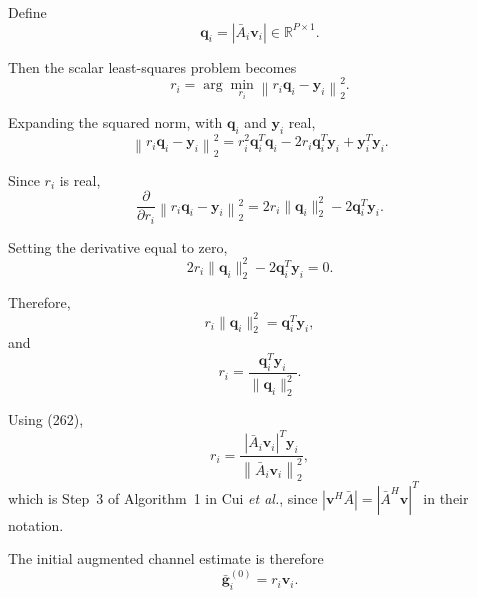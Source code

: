\documentclass[12pt,a4paper]{article}
\begin{document}
Define
\begin{equation}
\mathbf q_i
=
\left|
\bar A_i\mathbf v_i
\right|
\in\mathbb R^{P\times1}.
\tag{262}
\end{equation}

Then the scalar least-squares problem becomes
\begin{equation}
r_i
=
\arg\min_{r_i}
\left\|
r_i\mathbf q_i-\mathbf y_i
\right\|_2^2.
\tag{263}
\end{equation}

Expanding the squared norm, with $\mathbf q_i$ and $\mathbf y_i$ real,
\begin{equation}
\left\|
r_i\mathbf q_i-\mathbf y_i
\right\|_2^2
=
r_i^2\mathbf q_i^T\mathbf q_i
-
2r_i\mathbf q_i^T\mathbf y_i
+
\mathbf y_i^T\mathbf y_i.
\tag{264}
\end{equation}

Since $r_i$ is real,
\begin{equation}
\frac{\partial}{\partial r_i}
\left\|
r_i\mathbf q_i-\mathbf y_i
\right\|_2^2
=
2r_i\|\mathbf q_i\|_2^2
-
2\mathbf q_i^T\mathbf y_i.
\tag{265}
\end{equation}

Setting the derivative equal to zero,
\begin{equation}
2r_i\|\mathbf q_i\|_2^2
-
2\mathbf q_i^T\mathbf y_i
=
0.
\tag{266}
\end{equation}

Therefore,
\begin{equation}
r_i\|\mathbf q_i\|_2^2
=
\mathbf q_i^T\mathbf y_i,
\tag{267}
\end{equation}
and
\begin{equation}
\boxed{
r_i
=
\frac{\mathbf q_i^T\mathbf y_i}{\|\mathbf q_i\|_2^2}
}.
\tag{268}
\end{equation}

Using (262),
\begin{equation}
\boxed{
r_i
=
\frac{
\left|\bar A_i\mathbf v_i\right|^T\mathbf y_i
}{
\left\|\bar A_i\mathbf v_i\right\|_2^2
}
},
\tag{269}
\end{equation}
which is Step~3 of Algorithm~1 in Cui \emph{et al.}, since
$|\mathbf v^H\bar A|=|\bar A^H\mathbf v|^T$ in their notation.

The initial augmented channel estimate is therefore
\begin{equation}
\boxed{
\bar{\mathbf g}_i^{(0)}
=
r_i\mathbf v_i
}.
\tag{270}
\end{equation}

\end{document}
